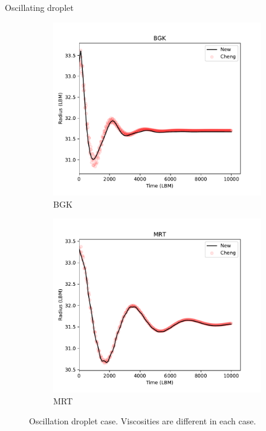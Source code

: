 \documentclass[8pt]{beamer}
\begin{document}
	\begin{frame}{Oscillating droplet}
		\begin{figure}[h]
			\centering
			\begin{subfigure}{.5\textwidth}
				\centering
				\includegraphics[width=.9\linewidth]{pics/BGKOsc.pdf}
				\caption{BGK}
				\label{fig:sub1}
			\end{subfigure}%
			\begin{subfigure}{.5\textwidth}
				\centering
				\includegraphics[width=.9\linewidth]{pics/MRTOsc.pdf}
				\caption{MRT}
				\label{fig:sub2}
			\end{subfigure}
			\caption{Oscillation droplet case. Viscosities are different in each case.}
			\label{fig:osci}
		\end{figure}
	\end{frame}
\end{document}
